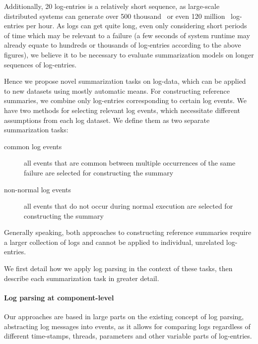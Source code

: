 Additionally, 20 log-entries is a relatively short sequence,
as large-scale distributed systems can generate over 500 thousand~\parencites[126]{hdfs_dataset}[125]{logpai_logparser_benchmarks}
or even 120 million~\parencites[1250]{cloud_diag} log-entries per hour.
As logs can get quite long, even only considering short periods of time which may be relevant to a failure
(a few seconds of system runtime may already equate to hundreds or
thousands of log-entries according to the above figures),
we believe it to be necessary to evaluate summarization models on longer sequences of log-entries.

Hence we propose novel summarization tasks on log-data,
which can be applied to new datasets using mostly automatic means.
For constructing reference summaries, we combine only log-entries corresponding to certain log events.
We have two methods for selecting relevant log events, which necessitate different assumptions from each log dataset.
We define them as two separate summarization tasks:
\begin{description}
\item[common log events] all events that are common between multiple occurrences of the same failure are selected for constructing the summary
\item[non-normal log events] all events that do not occur during normal execution are selected for constructing the summary
\end{description}
Generally speaking, both approaches to constructing reference summaries require a larger collection of logs and
cannot be applied to individual, unrelated log-entries.

We first detail how we apply log parsing in the context of these tasks,
then describe each summarization task in greater detail.

\paragraph{Log parsing at component-level}

Our approaches are based in large parts on the existing concept of log parsing,
abstracting log messages into events,
as it allows for comparing logs regardless of different
time-stamps, threads, parameters and other variable parts of log-entries.


